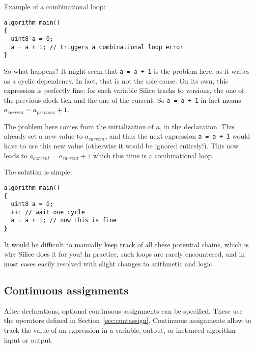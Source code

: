 \documentclass[a4]{article}
\newcommand\silice{Silice}
\begin{document}
\vspace*{2mm}
\noindent Example of a combinational loop:
\begin{verbatim}
algorithm main()
{
  uint8 a = 0;
  a = a + 1; // triggers a combinational loop error
}
\end{verbatim}

So what happens? It might seem that \texttt{a = a + 1} is the problem here, as it writes as a cyclic dependency. In fact, that is not the sole cause. On its own, this expression is perfectly fine: for each variable \silice{} tracks to versions, the one of the previous clock tick and the one of the current. So \texttt{a = a + 1} in fact means $a_{current} = a_{previous} + 1$.

The problem here comes from the initialization of $a$, in the declaration. This already set a new value to $a_{current}$, and thus the next expression \texttt{a = a + 1} would have to use this new value (otherwise it would be ignored entirely!). This now leads to $a_{current} = a_{current} + 1$ which this time is a combinational loop.

\vspace*{2mm}
\noindent The solution is simple:
\begin{verbatim}
algorithm main()
{
  uint8 a = 0;
  ++: // wait one cycle
  a = a + 1; // now this is fine
}
\end{verbatim}

It would be difficult to manually keep track of all these potential chains, which is why \silice{} does it for you! In practice, such loops are rarely encountered, and in most cases easily resolved with slight changes to arithmetic and logic.

\vspace*{5mm}
\noindent
{}


\subsection{Continuous assignments}

After declarations, optional continuous assignments can be specified.
These use the operators defined in Section~\ref{sec:contassign}.
%
Continuous assignments allow to track the value of an expression
in a variable, output, or instanced algorithm input or output.
\end{document}
